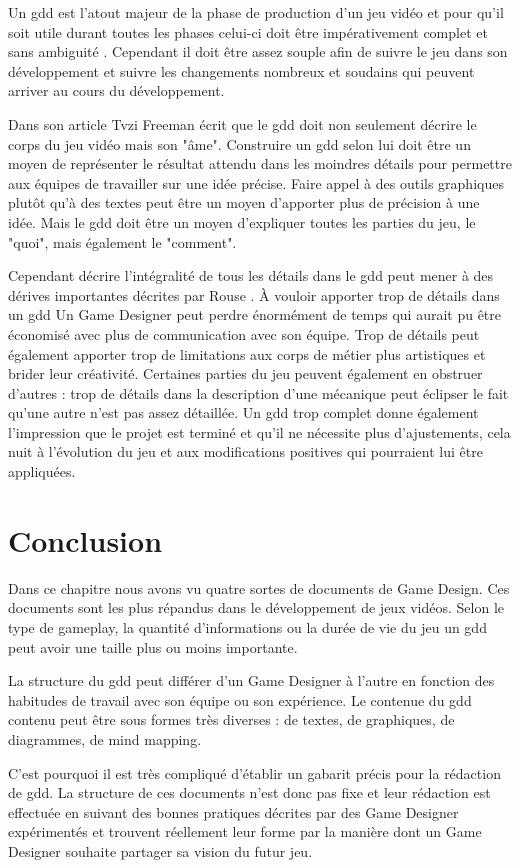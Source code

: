 Un \gls{gdd} est l'atout majeur de la phase de production d'un jeu vidéo et pour qu'il soit utile durant toutes les phases celui-ci doit être impérativement complet et sans ambiguité \cite{GD_Guidelines}. Cependant il doit être assez souple afin de suivre le jeu dans son développement et suivre les changements nombreux et soudains qui peuvent arriver au cours du développement.

Dans son article  \cite{gama_greateGDD} Tvzi Freeman écrit que le \gls{gdd} doit non seulement décrire le corps du jeu vidéo mais son "âme". Construire un \gls{gdd} selon lui doit être un moyen de représenter le résultat attendu dans les moindres détails pour permettre aux équipes de travailler sur une idée précise. Faire appel à des outils graphiques plutôt qu'à des textes peut être un moyen d'apporter plus de précision à une idée. Mais le \gls{gdd} doit être un moyen d'expliquer toutes les parties du jeu, le "quoi", mais également le "comment".

Cependant décrire l'intégralité de tous les détails dans le \gls{gdd} peut mener à des dérives importantes décrites par Rouse \cite{GD_theory_rouse}. À vouloir apporter trop de détails dans un \gls{gdd} Un Game Designer peut perdre énormément de temps qui aurait pu être économisé avec plus de communication avec son équipe. Trop de détails peut également apporter trop de limitations aux corps de métier plus artistiques et brider leur créativité. Certaines parties du jeu peuvent également en obstruer d'autres : trop de détails dans la description d'une mécanique peut éclipser le fait qu'une autre n'est pas assez détaillée. Un \gls{gdd} trop complet donne également l'impression que le projet est terminé et qu'il ne nécessite plus d'ajustements, cela nuit à l'évolution du jeu et aux modifications positives qui pourraient lui être appliquées.



\section{Conclusion}
Dans ce chapitre nous avons vu quatre sortes de documents de Game Design. Ces documents sont les plus répandus dans le développement de jeux vidéos. Selon le type de gameplay, la quantité d'informations ou la durée de vie du jeu un \gls{gdd} peut avoir une taille plus ou moins importante. 

La structure du \gls{gdd} peut différer d'un Game Designer à l'autre en fonction des habitudes de travail avec son équipe ou son expérience. Le contenue du \gls{gdd} contenu peut être sous formes très diverses : de textes, de graphiques, de diagrammes, de mind mapping. 

C'est pourquoi il est très compliqué d'établir un gabarit précis pour la rédaction de \gls{gdd}. La structure de ces documents n'est donc pas fixe et leur rédaction est effectuée en suivant des bonnes pratiques décrites par des Game Designer expérimentés et trouvent réellement leur forme par la manière dont un Game Designer souhaite partager sa vision du futur jeu.